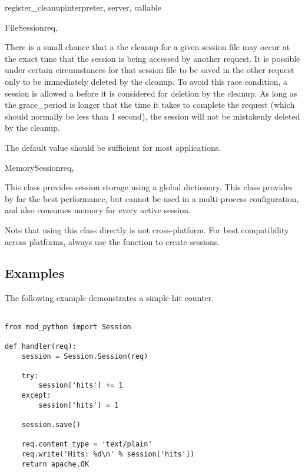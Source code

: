 \begin{funcdesc}{register_cleanup}{interpreter, server, callable}
\begin{classdesc}{FileSession}{req, }
\begin{itemize}
    There is a small chance that a the cleanup for a given session file
    may occur at the exact time that the session is being accessed by
    another request. It is possible under certain circumstances for that
    session file to be saved in the other request only to be immediately 
    deleted by the cleanup. To avoid this race condition, a session is
    allowed a  before it is considered for deletion by
    the cleanup.  As long as the grace_period is longer that the time it
    takes to complete the request (which should normally be less than 1
    second), the session will not be mistakenly deleted by the cleanup.

    The default value should be sufficient for most applications.
  \end{itemize}

\end{classdesc}

\begin{classdesc}{MemorySession}{req, }

  This class provides session storage using a global dictionary. This
  class provides by far the best performance, but cannot be used in a
  multi-process configuration, and also consumes memory for every
  active session.

  Note that using this class directly is not cross-platform. For best
  compatibility across platforms, always use the 
  function to create sessions.

\end{classdesc}

\subsection{Examples\label{pyapi-sess-example}}
The following example demonstrates a simple hit counter.

    \begin{verbatim}

from mod_python import Session

def handler(req):
    session = Session.Session(req)

    try:
        session['hits'] += 1
    except:
        session['hits'] = 1

    session.save()

    req.content_type = 'text/plain'
    req.write('Hits: %d\n' % session['hits'])
    return apache.OK 
    \end{verbatim}


\end{funcdesc}
